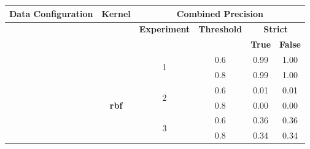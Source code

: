 \documentclass{mpaper}
\begin{document}
\begin{table}[]
\centering
\begin{tabular}{|c|c|cccc|}
\hline
\textbf{Data Configuration}     & \textbf{Kernel}       & \multicolumn{4}{c|}{\textbf{Combined Precision}}                                                                                                                                    \\ \hline
\textbf{}                       & \multicolumn{1}{l|}{} & \multicolumn{1}{c|}{\textbf{Experiment}}                        & \multicolumn{1}{c|}{\textbf{Threshold}} & \multicolumn{2}{c|}{\textbf{Strict}}                                    \\ \cline{3-6} 
\multicolumn{1}{|l|}{\textbf{}} & \textbf{}             & \multicolumn{1}{l|}{\textbf{}}                                  & \multicolumn{1}{l|}{\textbf{}}          & \multicolumn{1}{l}{\textbf{True}} & \multicolumn{1}{l|}{\textbf{False}} \\ \cline{3-6} 
\textbf{}                       & \textbf{}             & \multicolumn{1}{c|}{\multirow{2}{*}{1}}                         & \multicolumn{1}{c|}{0.6}                & 0.99                              & 1.00                                \\
\textbf{}                       & \textbf{}             & \multicolumn{1}{c|}{}                                           & \multicolumn{1}{c|}{0.8}                & 0.99                              & 1.00                                \\ \cline{3-6} 
\textbf{}                       & \textbf{}             & \multicolumn{1}{c|}{\multirow{2}{*}{2}}                         & \multicolumn{1}{c|}{0.6}                & 0.01                              & 0.01                                \\
\textbf{}                       & \textbf{rbf}          & \multicolumn{1}{c|}{}                                           & \multicolumn{1}{c|}{0.8}                & 0.00                              & 0.00                                \\ \cline{3-6} 
\textbf{}                       & \textbf{}             & \multicolumn{1}{c|}{\multirow{2}{*}{3}}                         & \multicolumn{1}{c|}{0.6}                & 0.36                              & 0.36                                \\
\textbf{}                       & \textbf{}             & \multicolumn{1}{c|}{}                                           & \multicolumn{1}{c|}{0.8}                & 0.34                              & 0.34                                \\ \cline{3-6} 

\end{tabular}
\end{table}
\end{document}
